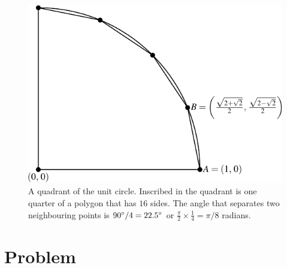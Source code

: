 \documentclass[a4paper,oneside,12pt]{article}
\begin{document}
\begin{figure}[!htbp]
\centering
\includegraphics[scale=1.1]{image/05/quadrant.pdf}
\caption{%
  A quadrant of the unit circle.  Inscribed in the quadrant is one
  quarter of a polygon that has $16$ sides.  The angle that separates
  two neighbouring points is ${90}^{\circ} / 4 = {22.5}^{\circ}$ or
  $\frac{\pi}{2} \times \frac{1}{4} = \pi / 8$ radians.
}
\label{fig:quadrant_inscribed_quarter_polygon_22_degrees}
\end{figure}



\section*{Problem}
\end{document}

